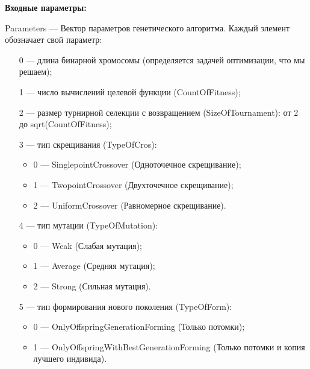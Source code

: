 \textbf{Входные параметры:}
 
Parameters --- Вектор параметров генетического алгоритма. Каждый элемент обозначает свой параметр:
 
 \begin{itemize}
 \item [0] --- длина бинарной хромосомы (определяется задачей оптимизации, что мы решаем);
 
 \item [1] --- число вычислений целевой функции (CountOfFitness);
 
 \item [2] --- размер турнирной селекции с возвращением (SizeOfTournament): от 2 до sqrt(CountOfFitness);
 
 \item [3] --- тип скрещивания (TypeOfCros):
  \begin{itemize}
       \item 0 --- SinglepointCrossover (Одноточечное скрещивание);
 
       \item 1 --- TwopointCrossover (Двухточечное скрещивание);
 
       \item 2 --- UniformCrossover (Равномерное скрещивание).
	    \end{itemize}
 
 \item [4] --- тип мутации (TypeOfMutation):
  \begin{itemize}
       \item 0 --- Weak (Слабая мутация);
 
       \item 1 --- Average (Средняя мутация);
 
       \item 2 --- Strong (Сильная мутация).
	    \end{itemize}
 
 \item [5] --- тип формирования нового поколения (TypeOfForm):
  \begin{itemize}
       \item 0 --- OnlyOffspringGenerationForming (Только потомки);
 
       \item 1 --- OnlyOffspringWithBestGenerationForming (Только потомки и копия лучшего индивида).
	    \end{itemize}
		
 \end{itemize}
 
